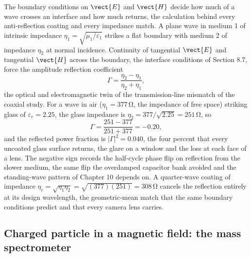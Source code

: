 The boundary conditions on $\vect{E}$ and $\vect{H}$ decide how much of a
wave crosses an interface and how much returns, the calculation behind
every anti-reflection coating and every impedance match. A plane wave in
medium 1 of intrinsic impedance $\eta_1 = \sqrt{\mu_1/\varepsilon_1}$
strikes a flat boundary with medium 2 of impedance $\eta_2$ at normal
incidence. Continuity of tangential $\vect{E}$ and tangential $\vect{H}$
across the boundary, the interface conditions of Section 8.7, force the
amplitude reflection coefficient
\[
\Gamma = \frac{\eta_2 - \eta_1}{\eta_2 + \eta_1},
\]
the optical and electromagnetic twin of the transmission-line mismatch of
the coaxial study. For a wave in air ($\eta_1 = 377\,\si{\ohm}$, the
impedance of free space) striking glass of $\varepsilon_r = 2.25$, the
glass impedance is $\eta_2 = 377/\sqrt{2.25} = 251\,\si{\ohm}$, so
\[
\Gamma = \frac{251 - 377}{251 + 377} = -0.20,
\]
and the reflected power fraction is $|\Gamma|^{2} = 0.040$, the four
percent that every uncoated glass surface returns, the glare on a window
and the loss at each face of a lens. The negative sign records the
half-cycle phase flip on reflection from the slower medium, the same flip
the overdamped capacitor bank avoided and the standing-wave pattern of
Chapter 10 depends on. A quarter-wave coating of impedance
$\eta_c = \sqrt{\eta_1\eta_2} = \sqrt{(377)(251)} = 308\,\si{\ohm}$
cancels the reflection entirely at its design wavelength, the
geometric-mean match that the same boundary conditions predict and that
every camera lens carries.

\subsection{Charged particle in a magnetic field: the mass spectrometer}

